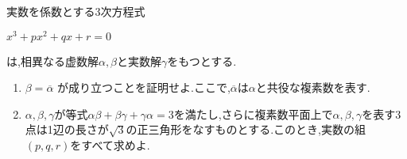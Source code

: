 \begin{problem}
実数を係数とする3次方程式
  \begin{center}
    $x^3+px^2+qx+r=0$
  \end{center}
は,相異なる虚数解$\alpha,\beta$と実数解$\gamma$をもつとする.
  \begin{enumerate}
    \item $\beta = \overline{\alpha}$ が成り立つことを証明せよ.ここで,$\overline{\alpha}$は$\alpha$と共役な複素数を表す.
    \item $\alpha,\beta,\gamma$が等式$\alpha\beta+\beta\gamma+\gamma\alpha=3$を満たし,さらに複素数平面上で$\alpha,\beta,\gamma$を表す3点は1辺の長さが$\sqrt{3}$の正三角形をなすものとする.このとき,実数の組$(p,q,r)$をすべて求めよ.
  \end{enumerate}
\end{problem}
\kaie　%
